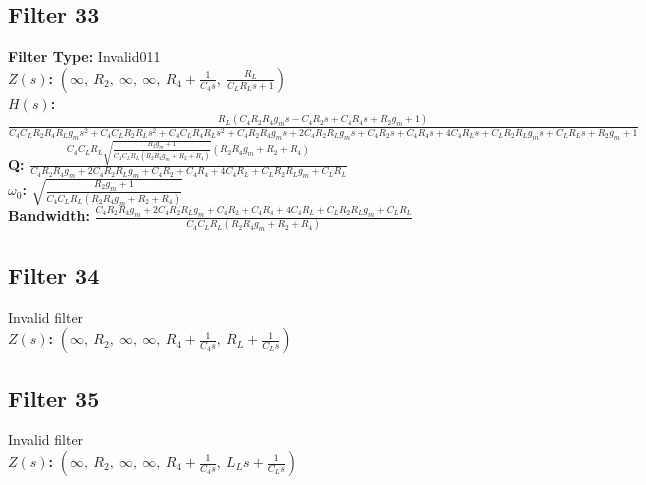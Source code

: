 \documentclass{article}
\begin{document}
\subsection*{Filter 33}
\textbf{Filter Type:} Invalid011 \\ 
\textbf{$Z(s)$:} $\left( \infty, \  R_{2}, \  \infty, \  \infty, \  R_{4} + \frac{1}{C_{4} s}, \  \frac{R_{L}}{C_{L} R_{L} s + 1}\right)$ \\ 
\textbf{$H(s)$:} $\frac{R_{L} \left(C_{4} R_{2} R_{4} g_{m} s - C_{4} R_{2} s + C_{4} R_{4} s + R_{2} g_{m} + 1\right)}{C_{4} C_{L} R_{2} R_{4} R_{L} g_{m} s^{2} + C_{4} C_{L} R_{2} R_{L} s^{2} + C_{4} C_{L} R_{4} R_{L} s^{2} + C_{4} R_{2} R_{4} g_{m} s + 2 C_{4} R_{2} R_{L} g_{m} s + C_{4} R_{2} s + C_{4} R_{4} s + 4 C_{4} R_{L} s + C_{L} R_{2} R_{L} g_{m} s + C_{L} R_{L} s + R_{2} g_{m} + 1}$ \\ 
\textbf{Q:} $\frac{C_{4} C_{L} R_{L} \sqrt{\frac{R_{2} g_{m} + 1}{C_{4} C_{L} R_{L} \left(R_{2} R_{4} g_{m} + R_{2} + R_{4}\right)}} \left(R_{2} R_{4} g_{m} + R_{2} + R_{4}\right)}{C_{4} R_{2} R_{4} g_{m} + 2 C_{4} R_{2} R_{L} g_{m} + C_{4} R_{2} + C_{4} R_{4} + 4 C_{4} R_{L} + C_{L} R_{2} R_{L} g_{m} + C_{L} R_{L}}$ \\ 
\textbf{$\omega_0$:} $\sqrt{\frac{R_{2} g_{m} + 1}{C_{4} C_{L} R_{L} \left(R_{2} R_{4} g_{m} + R_{2} + R_{4}\right)}}$ \\ 
\textbf{Bandwidth:} $\frac{C_{4} R_{2} R_{4} g_{m} + 2 C_{4} R_{2} R_{L} g_{m} + C_{4} R_{2} + C_{4} R_{4} + 4 C_{4} R_{L} + C_{L} R_{2} R_{L} g_{m} + C_{L} R_{L}}{C_{4} C_{L} R_{L} \left(R_{2} R_{4} g_{m} + R_{2} + R_{4}\right)}$ \\ 
\subsection*{Filter 34}
Invalid filter \\ 
\textbf{$Z(s)$:} $\left( \infty, \  R_{2}, \  \infty, \  \infty, \  R_{4} + \frac{1}{C_{4} s}, \  R_{L} + \frac{1}{C_{L} s}\right)$ \\ 
\subsection*{Filter 35}
Invalid filter \\ 
\textbf{$Z(s)$:} $\left( \infty, \  R_{2}, \  \infty, \  \infty, \  R_{4} + \frac{1}{C_{4} s}, \  L_{L} s + \frac{1}{C_{L} s}\right)$ \\ 
\end{document}
